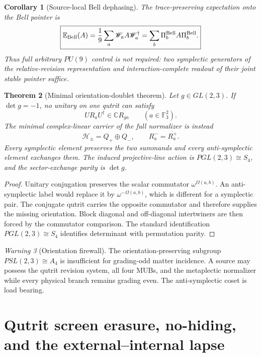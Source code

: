\documentclass[11pt,oneside,openany]{book}
\numberwithin{equation}{chapter}
\newtheorem{theorem}{Theorem}[chapter]
\newtheorem{corollary}[theorem]{Corollary}
\theoremstyle{definition}
\theoremstyle{remark}
\newtheorem{warning}[theorem]{Warning}
\newcommand{\C}{\mathbb C}
\newcommand{\Fthree}{\mathbb F_3}
\begin{document}
\begin{corollary}[Source-local Bell dephasing]
\label{cor:v5-bell-dephasing}
The trace-preserving expectation onto the Bell pointer is
\[
 \boxed{
 \mathbb E_{\rm Bell}(A)
 =\frac19\sum_a\mathscr W_aA\mathscr W_a^\dagger
 =\sum_b\Pi_b^{\rm Bell}A\Pi_b^{\rm Bell}.}
\]
Thus full arbitrary \(PU(9)\) control is not required: two symplectic
generators of the relative-revision representation and interaction-complete
readout of their joint stable pointer suffice.
\end{corollary}

\begin{theorem}[Minimal orientation-doublet theorem]
\label{thm:v5-orientation-doublet}
Let \(g\in GL(2,3)\).  If \(\det g=-1\), no unitary on one qutrit can satisfy
\[
 UR_aU^\dagger\in\C R_{ga}
 \qquad(a\in\Fthree^2).
\]
The minimal complex-linear carrier of the full normalizer is instead
\[
 \boxed{\mathcal H_\pm=Q_+\oplus Q_-,\qquad
 R_a^-=\overline{R_a^+}.}
\]
Every symplectic element preserves the two summands and every
anti-symplectic element exchanges them.  The induced projective-line action is
\(PGL(2,3)\cong S_4\), and the sector-exchange parity is \(\det g\).
\end{theorem}

\begin{proof}
Unitary conjugation preserves the scalar commutator
\(\omega^{\Omega(a,b)}\).  An anti-symplectic label would replace it by
\(\omega^{-\Omega(a,b)}\), which is different for a symplectic pair.  The
conjugate qutrit carries the opposite commutator and therefore supplies the
missing orientation.  Block diagonal and off-diagonal intertwiners are then
forced by the commutator comparison.  The standard identification
\(PGL(2,3)\cong S_4\) identifies determinant with permutation parity.
\end{proof}

\begin{warning}[Orientation firewall]
The orientation-preserving subgroup \(PSL(2,3)\cong A_4\) is insufficient for
grading-odd matter incidence.  A source may possess the qutrit revision
system, all four MUBs, and the metaplectic normalizer while every physical
branch remains grading even.  The anti-symplectic coset is load bearing.
\end{warning}


\chapter{Qutrit screen erasure, no-hiding, and the external--internal lapse}
\label{ch:screen-record}
\end{document}
